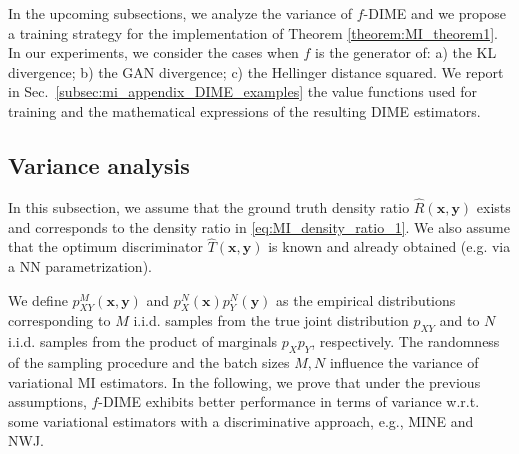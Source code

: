 In the upcoming subsections, we analyze the variance of $f$-DIME and we propose a training strategy for the implementation of Theorem \ref{theorem:MI_theorem1}.
In our experiments, we consider the cases when $f$ is the generator of: a) the KL divergence; b) the GAN divergence; c) the Hellinger distance squared. We report in Sec.~\ref{subsec:mi_appendix_DIME_examples} the value functions used for training and the mathematical expressions of the resulting DIME estimators.

\subsection{Variance analysis}
\label{subsec:mi_variance}
In this subsection, we assume that the ground truth density ratio $\hat{R}(\mathbf{x},\mathbf{y})$ exists and corresponds to the density ratio in \eqref{eq:MI_density_ratio_1}. We also assume that the optimum discriminator $\hat{T}(\mathbf{x},\mathbf{y})$ is known and already obtained (e.g. via a NN parametrization). 

We define $p^M_{XY}(\mathbf{x},\mathbf{y})$ and $p^N_{X}(\mathbf{x})p^N_Y(\mathbf{y})$ as the empirical distributions corresponding to $M$ i.i.d. samples from the true joint distribution $p_{XY}$ and to $N$ i.i.d. samples from the product of marginals $p_Xp_Y$, respectively. The randomness of the sampling procedure and the batch sizes $M,N$ influence the variance of variational MI estimators. In the following, we prove that under the previous assumptions, $f$-DIME exhibits better performance in terms of variance w.r.t. some variational estimators with a discriminative approach, e.g., MINE and NWJ.

